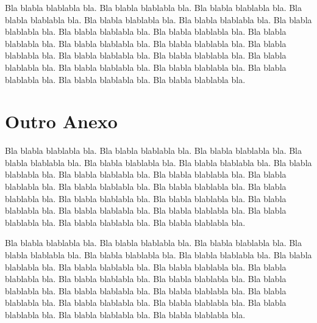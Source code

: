 \documentclass[diss,capa]{texufpel}
\begin{document}
Bla blabla blablabla bla.  Bla blabla blablabla bla.  Bla blabla
blablabla bla.  Bla blabla blablabla bla.  Bla blabla blablabla bla.
Bla blabla blablabla bla.  Bla blabla blablabla bla.  Bla blabla
blablabla bla.  Bla blabla blablabla bla.  Bla blabla blablabla bla.
Bla blabla blablabla bla.  Bla blabla blablabla bla.  Bla blabla
blablabla bla.  Bla blabla blablabla bla.  Bla blabla blablabla bla.
Bla blabla blablabla bla.  Bla blabla blablabla bla.  Bla blabla
blablabla bla.  Bla blabla blablabla bla.  Bla blabla blablabla bla.
Bla blabla blablabla bla.

\chapter{Outro Anexo}

Bla blabla blablabla bla.  Bla blabla blablabla bla.  Bla blabla
blablabla bla.  Bla blabla blablabla bla.  Bla blabla blablabla bla.
Bla blabla blablabla bla.  Bla blabla blablabla bla.  Bla blabla
blablabla bla.  Bla blabla blablabla bla.  Bla blabla blablabla bla.
Bla blabla blablabla bla.  Bla blabla blablabla bla.  Bla blabla
blablabla bla.  Bla blabla blablabla bla.  Bla blabla blablabla bla.
Bla blabla blablabla bla.  Bla blabla blablabla bla.  Bla blabla
blablabla bla.  Bla blabla blablabla bla.  Bla blabla blablabla bla.
Bla blabla blablabla bla.

Bla blabla blablabla bla.  Bla blabla blablabla bla.  Bla blabla
blablabla bla.  Bla blabla blablabla bla.  Bla blabla blablabla bla.
Bla blabla blablabla bla.  Bla blabla blablabla bla.  Bla blabla
blablabla bla.  Bla blabla blablabla bla.  Bla blabla blablabla bla.
Bla blabla blablabla bla.  Bla blabla blablabla bla.  Bla blabla
blablabla bla.  Bla blabla blablabla bla.  Bla blabla blablabla bla.
Bla blabla blablabla bla.  Bla blabla blablabla bla.  Bla blabla
blablabla bla.  Bla blabla blablabla bla.  Bla blabla blablabla bla.
Bla blabla blablabla bla.
\end{document}
